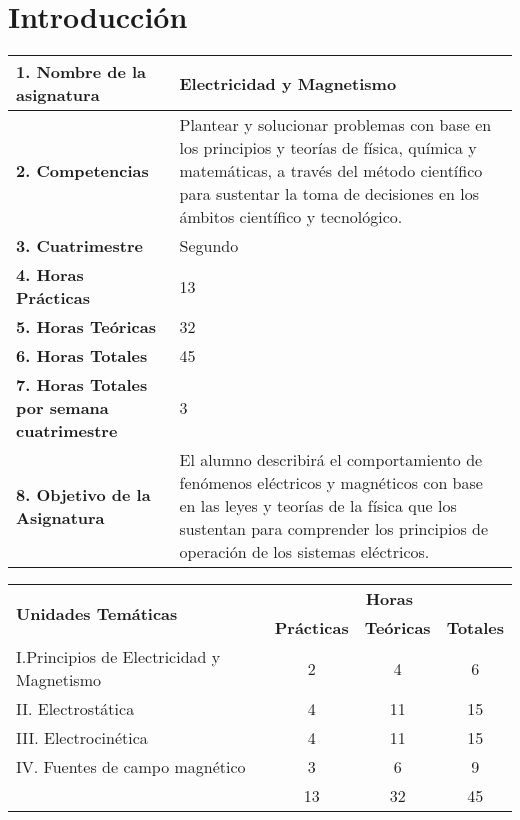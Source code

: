 \chapter{Introducción}
	\begin{tabular}{|p{6cm}|p{9cm}|}
	\hline 
	\textbf{1. Nombre de la asignatura }& Electricidad y Magnetismo \\
	\hline 
	\textbf{2. Competencias }& Plantear y solucionar problemas con base en los principios y teorías de física, química y matemáticas, a
	través del método científico para sustentar la toma de decisiones en los ámbitos científico y tecnológico.
	
 \\
       \hline 
       \textbf{3. Cuatrimestre} & Segundo \\
       \hline 
       \textbf{4. Horas Prácticas} & 13 \\
       \hline
        \textbf{5. Horas Teóricas} & 32 \\
        \hline
       \textbf{6. Horas Totales} & 45 \\
        \hline
        \textbf{7. Horas Totales por semana cuatrimestre} & 3 \\
        \hline
        \textbf{8. Objetivo de la Asignatura} & El alumno describirá el comportamiento de fenómenos eléctricos y magnéticos con base en las leyes y teorías de la física que los sustentan para comprender los principios de operación de los sistemas eléctricos. \\
        \hline
	\end{tabular}
	
\begin{tabular}{|p{9.5cm}|c|c|c|}
\hline
\multirow{2}{*}{\textbf{Unidades Temáticas}} & \multicolumn{3}{c}{\textbf{Horas}} \\


  & \textbf{Prácticas} & \textbf{Teóricas} & \textbf{Totales} \\
  \hline
 I.Principios de Electricidad y Magnetismo & 2 & 4 & 6\\
\hline
II. Electrostática & 4 & 11 & 15\\
\hline
III. Electrocinética & 4 & 11 & 15 \\
\hline
IV. Fuentes de campo magnético & 3 & 6 & 9 \\
\hline
 & 13 & 32 & 45 \\
\hline


\end{tabular}